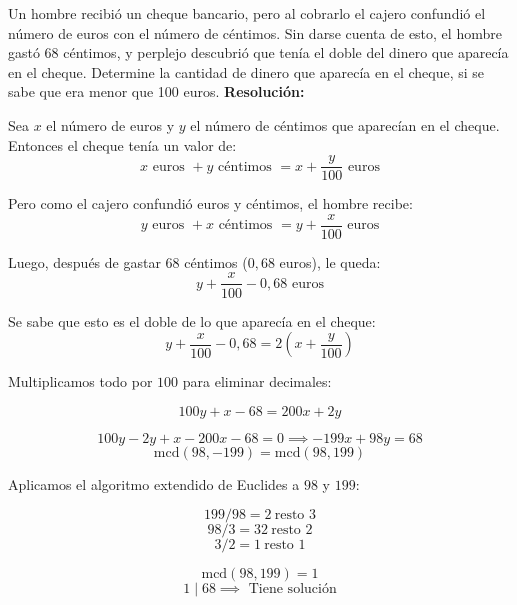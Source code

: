 \documentclass[a4paper,12pt]{article}
\begin{document}
\begin{ejercicio}[title=Ejercicio 12]
Un hombre recibió un cheque bancario, pero al cobrarlo el cajero confundió el número de euros con el número de céntimos. Sin darse cuenta de esto, el hombre gastó 68 céntimos, y perplejo descubrió que tenía el doble del dinero que aparecía en el cheque. Determine la cantidad de dinero que aparecía en el cheque, si se sabe que era menor que 100 euros.
\tcblower
\textbf{Resolución:}

Sea $x$ el número de euros y $y$ el número de céntimos que aparecían en el cheque. Entonces el cheque tenía un valor de:
\[
x \text{ euros } + y \text{ céntimos } = x + \frac{y}{100} \text{ euros}
\]

Pero como el cajero confundió euros y céntimos, el hombre recibe:
\[
y \text{ euros } + x \text{ céntimos } = y + \frac{x}{100} \text{ euros}
\]

Luego, después de gastar 68 céntimos ($0,68$ euros), le queda:
\[
y + \frac{x}{100} - 0,68 \text{ euros}
\]

Se sabe que esto es el doble de lo que aparecía en el cheque:
\[
y + \frac{x}{100} - 0,68 = 2 \left( x + \frac{y}{100} \right)
\]

Multiplicamos todo por $100$ para eliminar decimales:

\[
100y + x - 68 = 200x + 2y
\]

\[
100y - 2y + x - 200x - 68 = 0 \implies -199x +98y = 68
\]
\[
\text{mcd}(98,-199) = \text{mcd}(98,199)
\]

\vspace{0.5em}

Aplicamos el algoritmo extendido de Euclides a $98$ y $199$:

\[
199 / 98 = 2 \ \text{resto } 3
\]
\[
98 / 3 = 32 \ \text{resto } 2
\]
\[
3 / 2 = 1 \ \text{resto } \boxed{1}
\]

\[
\text{mcd}(98,199) = \boxed{1}
\]
\[
1 \mid 68 \implies\text{ Tiene solución}
\]

\end{ejercicio}
\end{document}
